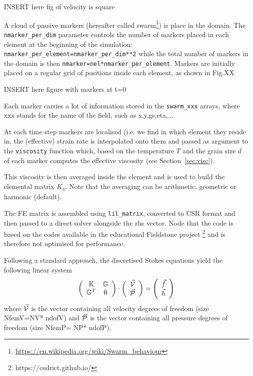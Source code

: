 \documentclass[a4paper]{article}
\newcommand{\K}{{\mathbb{K}}}
\newcommand{\G}{{\mathbb{G}}}
\begin{document}
\begin{center}
INSERT here fig of velocity is square
\end{center}

A cloud of passive markers (hereafter called swarm\footnote{\url{https://en.wikipedia.org/wiki/Swarm_behaviour}}) is 
place in the domain. 
The \lstinline{nmarker_per_dim} parameter controls the number of
markers placed in each element at the beginning of the simulation:
\lstinline{nmarker_per_element=nmarker_per_dim**2}
while the total number of markers in the domain is then 
\lstinline{nmarker=nel*nmarker_per_element}.
Markers are initially placed on a regular grid of positions inside each element, as shown in 
Fig.XX

\begin{center}
INSERT here figure with markers at t=0
\end{center}

Each marker carries a lot of information stored in the \lstinline{swarm_xxx}
arrays, where xxx stands for the name of the field, such as x,y,gs,eta,... 

At each time step markers are localised (i.e. we find in which element they reside
in, the (effective) strain rate is interpolated onto them and passed as 
argument to the \lstinline{viscosity} function which, based on the 
temperature $T$ and the grain size $d$ of each marker computes the 
effective viscosity (see Section~\ref{sec:visc}).

This viscosity is then averaged inside the element and is used to build
the elemental matrix $K_\eta$. Note that the averaging can be arithmetic,
geometric or harmonic (default).

The FE matrix is assembled using \lstinline{lil_matrix},
converted to CSR format and then passed to a direct solver alongside the rhs vector.
Node that the code is based on the codes available in the educational Fieldstone project
\footnote{https://cedrict.github.io/}
and is therefore not optimised for performance.


Following a standard approach, the discretised Stokes equations yield
the following linear system
\[
\left(
\begin{array}{cc}
\K & \G \\
\G^T & 0 
\end{array}
\right)
\cdot
\left(
\begin{array}{c}
\vec{\cal V} \\ 
\vec{\cal P}
\end{array}
\right)
=
\left(
\begin{array}{c}
\vec{f} \\ 
\vec{h}
\end{array}
\right)
\]
where $\vec{\cal V}$ is the vector containing all velocity degrees of 
freedom (size { NfemV}={NV}*{ ndofV})
and $\vec{\cal P}$ is the vector containing all pressure degrees of freedom 
(size { NfemP}={ NP}*{ ndofP}).
\end{document}
